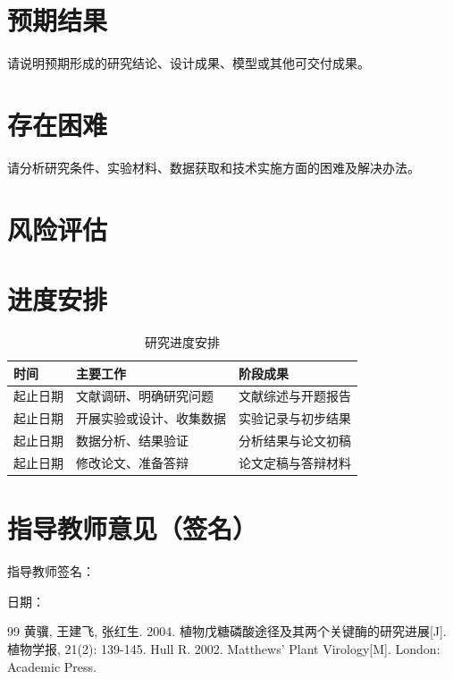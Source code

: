 \documentclass{nwafu-proposal}
\begin{document}
\section{预期结果}
请说明预期形成的研究结论、设计成果、模型或其他可交付成果。

\section{存在困难}
请分析研究条件、实验材料、数据获取和技术实施方面的困难及解决办法。

\section{风险评估}


\section{进度安排}
\begin{table}[htbp]
\caption{研究进度安排}
\label{tab:schedule}
\centering
\fontsize{10.5pt}{18pt}\selectfont
\begin{tabularx}{\linewidth}{@{}p{3cm}XX@{}}
\toprule
时间 & 主要工作 & 阶段成果 \\
\midrule
起止日期 & 文献调研、明确研究问题 & 文献综述与开题报告 \\
起止日期 & 开展实验或设计、收集数据 & 实验记录与初步结果 \\
起止日期 & 数据分析、结果验证 & 分析结果与论文初稿 \\
起止日期 & 修改论文、准备答辩 & 论文定稿与答辩材料 \\
\bottomrule
\end{tabularx}
\end{table}

\section{指导教师意见（签名）}
\vspace*{2cm}
\begin{flushright}
指导教师签名：\blankfield{3cm}{}\par
日期：\blankfield{3cm}{}
\end{flushright}

\begin{thebibliography}{99}
黄骥, 王建飞, 张红生. 2004. 植物戊糖磷酸途径及其两个关键酶的研究进展[J]. 植物学报, 21(2): 139-145.
Hull R. 2002. Matthews' Plant Virology[M]. London: Academic Press.
\end{thebibliography}
\end{document}

